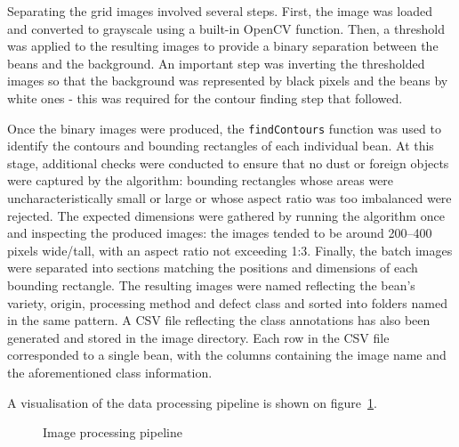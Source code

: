 Separating the grid images involved several steps.
First, the image was loaded and converted to grayscale using a built-in OpenCV function.
Then, a threshold was applied to the resulting images to provide a binary separation between the beans and the background.
An important step was inverting the thresholded images so that the background was represented by black pixels
and the beans by white ones - this was required for the contour finding step that followed.

Once the binary images were produced, the \verb |findContours| function was used to identify the contours and
bounding rectangles of each individual bean.
At this stage, additional checks were conducted to ensure that no dust or foreign objects were captured by the algorithm:
bounding rectangles whose areas were uncharacteristically small or large or whose aspect ratio was too imbalanced were rejected.
The expected dimensions were gathered by running the algorithm once and inspecting the produced images: the images tended
to be around 200--400 pixels wide/tall, with an aspect ratio not exceeding 1:3.
Finally, the batch images were separated into sections matching the positions and dimensions of each bounding rectangle.
The resulting images were named reflecting the bean's variety, origin, processing method and defect class and sorted into folders
named in the same pattern.
A CSV file reflecting the class annotations has also been generated and stored in the image directory.
Each row in the CSV file corresponded to a single bean, with the columns containing the image name and the
aforementioned class information.

A visualisation of the data processing pipeline is shown on figure~\ref{fig:imgProcessing}.

\begin{figure}[h]
	\centering
{}
	\caption{Image processing pipeline}
	\label{fig:imgProcessing}
\end{figure}

